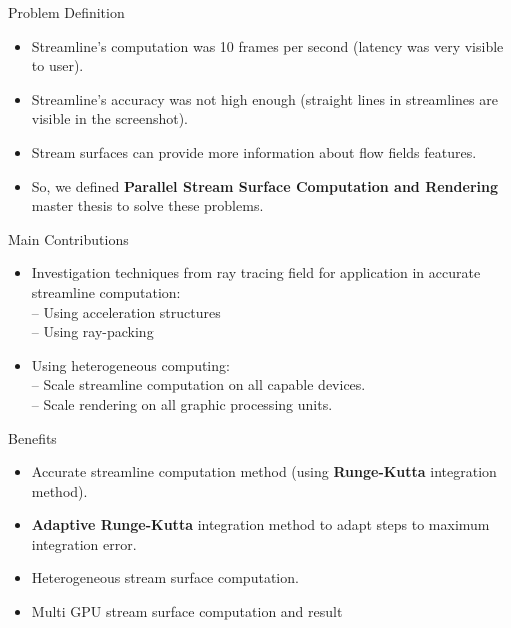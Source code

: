 \documentclass{beamer}
\begin{document}
\begin{frame}{Problem Definition}
	\begin{itemize}
		\item Streamline's computation was 10 frames per second (latency was very visible to user).
		\item Streamline's accuracy was not high enough (straight lines in streamlines are visible in the screenshot).
		\item Stream surfaces can provide more information about flow fields features.
		\item So, we defined \textbf{Parallel Stream Surface Computation and Rendering} master thesis to solve these problems.		
	\end{itemize}
\end{frame}

\begin{frame}{Main Contributions}
	\begin{itemize}
		\item Investigation techniques from ray tracing field for application in accurate streamline computation:\\
		  -- Using acceleration structures\\
		  -- Using ray-packing\\
		\item Using heterogeneous computing:\\
		  -- Scale streamline computation on all capable devices.\\
		  -- Scale rendering on all graphic processing units.\\
	\end{itemize}
\end{frame}

\begin{frame}{Benefits}
	
	\begin{itemize}
		\item Accurate streamline computation method (using \textbf{Runge-Kutta} integration method).
		\item \textbf{Adaptive Runge-Kutta} integration method to adapt steps to maximum integration error.
		\item Heterogeneous stream surface computation.
		\item Multi GPU stream surface computation and result 
	\end{itemize}
	\textbf{}
	
\end{frame}
\end{document}
